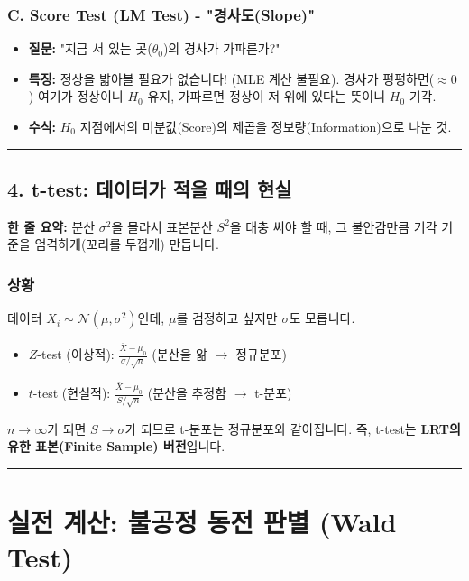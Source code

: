 \documentclass[11pt,a4paper]{book}
\theoremstyle{definition}
\begin{document}
\subsubsection*{C. Score Test (LM Test) - "경사도(Slope)"}
\begin{itemize}
    \item \textbf{질문:} "지금 서 있는 곳($\theta_0$)의 경사가 가파른가?"
    \item \textbf{특징:} 정상을 밟아볼 필요가 없습니다! (MLE 계산 불필요). 경사가 평평하면($\approx 0$) 여기가 정상이니 $H_0$ 유지, 가파르면 정상이 저 위에 있다는 뜻이니 $H_0$ 기각.
    \item \textbf{수식:} $H_0$ 지점에서의 미분값(Score)의 제곱을 정보량(Information)으로 나눈 것.
\end{itemize}

\vspace{0.5cm}\hrule\vspace{0.5cm}

\subsection{4. t-test: 데이터가 적을 때의 현실}

\begin{conceptbox}[title={개념 4: 모르는 게 있으면 꼬리가 두꺼워진다}]
\textbf{한 줄 요약:} 분산 $\sigma^2$을 몰라서 표본분산 $S^2$을 대충 써야 할 때, 그 불안감만큼 기각 기준을 엄격하게(꼬리를 두껍게) 만듭니다.
\end{conceptbox}

\subsubsection*{상황}
데이터 $X_i \sim \mathcal{N}(\mu, \sigma^2)$인데, $\mu$를 검정하고 싶지만 $\sigma$도 모릅니다.
\begin{itemize}
    \item $Z$-test (이상적): $\frac{\bar{X} - \mu_0}{\sigma/\sqrt{n}}$ (분산을 앎 $\to$ 정규분포)
    \item $t$-test (현실적): $\frac{\bar{X} - \mu_0}{S/\sqrt{n}}$ (분산을 추정함 $\to$ t-분포)
\end{itemize}
$n \to \infty$가 되면 $S \to \sigma$가 되므로 t-분포는 정규분포와 같아집니다. 즉, t-test는 \textbf{LRT의 유한 표본(Finite Sample) 버전}입니다.

\vspace{0.5cm}\hrule\vspace{0.5cm}

\section{실전 계산: 불공정 동전 판별 (Wald Test)}
\end{document}
